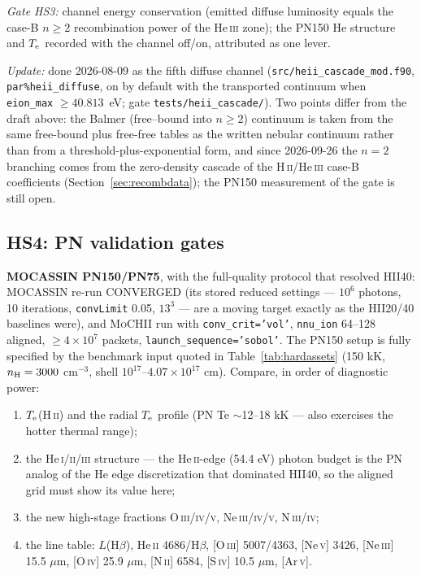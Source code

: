 \documentclass[english,a4paper]{my_memo}
\newcommand{\code}[1]{\texttt{#1}}
\newcommand{\MoCHII}{\textsc{MoCHII}}
\newcommand{\HII}{H\,\textsc{ii}}
\newcommand{\HeII}{He\,\textsc{ii}}
\newcommand{\HeIII}{He\,\textsc{iii}}
\newcommand{\Te}{T_{\rm e}}
\begin{document}
\emph{Gate HS3:} channel energy conservation (emitted diffuse
luminosity equals the case-B $n\geq2$ recombination power of the
\HeIII{} zone); the PN150 He structure and $\Te$ recorded with the
channel off/on, attributed as one lever.

\emph{Update:} done 2026-08-09 as the fifth diffuse channel
(\code{src/heii\_cascade\_mod.f90}, \code{par\%heii\_diffuse}, on by default
with the transported continuum when \code{eion\_max} $\ge 40.813$~eV; gate
\code{tests/heii\_cascade/}).  Two points differ from the draft above: the
Balmer (free--bound into $n\ge2$) continuum is taken from the same
free-bound plus free-free tables as the written nebular continuum rather than
from a threshold-plus-exponential form, and since 2026-09-26 the $n=2$
branching comes from the zero-density cascade of the \HII{}/\HeIII{} case-B
coefficients (Section~\ref{sec:recombdata}); the PN150 measurement of the
gate is still open.

\subsection{HS4: PN validation gates}

\textbf{MOCASSIN PN150/PN75}, with the full-quality protocol that
resolved HII40: MOCASSIN re-run CONVERGED (its stored reduced settings
--- $10^6$ photons, 10 iterations, \code{convLimit} 0.05, $13^3$ ---
are a moving target exactly as the HII20/40 baselines were), and
\MoCHII{} run with \code{conv\_crit='vol'}, \code{nnu\_ion} 64--128
aligned, $\geq4\times10^7$ packets, \code{launch\_sequence='sobol'}.
The PN150 setup is fully specified by the benchmark input quoted in
Table~\ref{tab:hardassets} (150 kK, $n_{\rm H}=3000$ cm$^{-3}$, shell
$10^{17}$--$4.07\times10^{17}$ cm).  Compare, in order of diagnostic
power:

\begin{enumerate}[leftmargin=2em]
\item $\Te$(\HII{}) and the radial $\Te$ profile (PN Te $\sim$12--18 kK
  --- also exercises the hotter thermal range);
\item the He\,\textsc{i}/\textsc{ii}/\textsc{iii} structure --- the
  \HeII{}-edge (54.4 eV) photon budget is the PN analog of the He edge
  discretization that dominated HII40, so the aligned grid must show
  its value here;
\item the new high-stage fractions O\,\textsc{iii/iv/v},
  Ne\,\textsc{iii/iv/v}, N\,\textsc{iii/iv};
\item the line table: $L$(H$\beta$), \HeII{} 4686/H$\beta$,
  [O\,\textsc{iii}] 5007/4363, [Ne\,\textsc{v}] 3426,
  [Ne\,\textsc{iii}] 15.5 $\mu$m, [O\,\textsc{iv}] 25.9 $\mu$m,
  [N\,\textsc{ii}] 6584, [S\,\textsc{iv}] 10.5 $\mu$m,
  [Ar\,\textsc{v}].
\end{enumerate}
\end{document}
